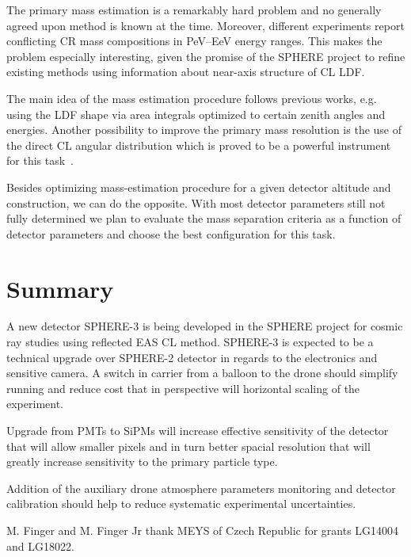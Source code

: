 \documentclass[a4paper,11pt]{article}
\begin{document}
The primary mass estimation is a remarkably hard problem and no generally agreed upon method is known at the time. Moreover, different experiments report conflicting CR mass compositions in PeV--EeV energy ranges. This makes the problem especially interesting, given the promise of the SPHERE project to refine existing methods using information about near-axis structure of CL LDF.

The main idea of the mass estimation procedure follows previous works, e.g. using the LDF shape \cite{Anokhina2009} via area integrals optimized to certain zenith angles and energies. %
Another possibility to improve the primary mass resolution is the use of the direct CL angular distribution which is proved to be a powerful instrument for this task~\cite{Gal18a}.

Besides optimizing mass-estimation procedure for a given detector altitude and construction, we can do the opposite. With most detector parameters still not fully determined we plan to evaluate the mass separation criteria as a function of detector parameters and choose the best configuration for this task.

\section{Summary}
A new detector SPHERE-3 is being developed in the SPHERE project for cosmic ray studies using reflected EAS CL method. SPHERE-3 is expected to be a technical upgrade over SPHERE-2 detector in regards to the electronics and sensitive camera. A switch in carrier from a balloon to the drone should simplify running and reduce cost that in perspective will horizontal scaling of the experiment. 

Upgrade from PMTs to SiPMs will increase effective sensitivity of the detector that will allow smaller pixels and in turn better spacial resolution that will greatly increase sensitivity to the primary particle type.

Addition of the auxiliary drone atmosphere parameters monitoring and detector calibration should help to reduce systematic experimental uncertainties.

\acknowledgments
M. Finger and M. Finger Jr thank MEYS of Czech Republic for grants LG14004 and LG18022.



\end{document}
